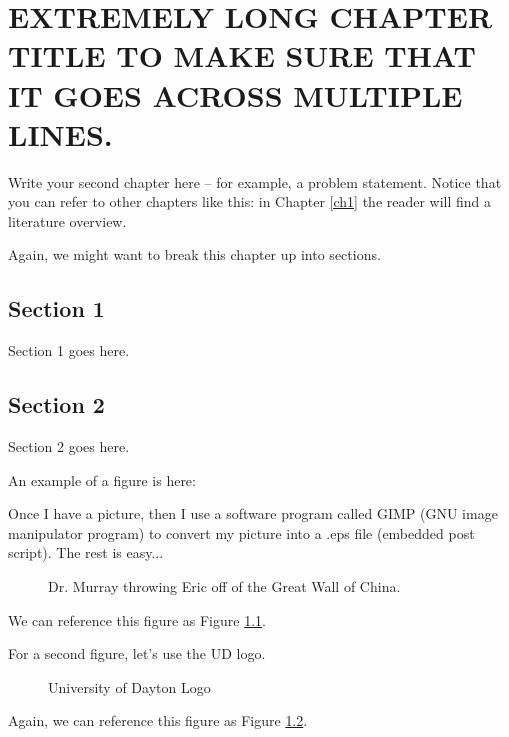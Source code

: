 \chapter{EXTREMELY LONG CHAPTER TITLE TO MAKE SURE THAT IT GOES ACROSS MULTIPLE LINES.}
\label{ch2}

Write your second chapter here -- for example, a problem
statement. Notice that you can refer to other chapters like this: in
Chapter \ref{ch1} the reader will find a literature overview.

Again, we might want to break this chapter up into sections.

\section{Section 1}

Section 1 goes here.

\section{Section 2}

Section 2 goes here.

An example of a figure is here:

Once I have a picture, then I use a software program called GIMP (GNU image manipulator program) to convert my picture into a .eps file (embedded post script).  The rest is easy...
\begin{figure}[ht]
    \centerline{\epsfysize 7cm  }
    \caption{Dr. Murray throwing Eric off of the
		Great Wall of China.}
    \label{fig:Drew_Eric}
\end{figure}
We can reference this figure as Figure \ref{fig:Drew_Eric}.

For a second figure, let's use the UD logo.
\begin{figure}[ht]
    \centerline{\epsfysize 7cm  }
    \caption{University of Dayton Logo}
    \label{fig:UD_logo}
\end{figure}
Again, we can reference this figure as Figure \ref{fig:UD_logo}. 
